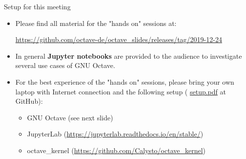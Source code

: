 \begin{frame}{Setup for this meeting}
\begin{itemize}
\itemsep1em
\item
Please find all material for the "hands on" sessions at:

{\color{DarkBlue}\small
\url{https://github.com/octave-de/octave_slides/releases/tag/2019-12-24}
}

\item
In general \textbf{Jupyter notebooks} are provided to the audience
to investigate several use cases of GNU Octave.

\item
For the best experience of the "hands on" sessions,
please bring your own laptop with Internet connection and the following setup
({\color{red}
\href{https://github.com/octave-de/octave_slides/releases/tag/2019-12-24}{setup.pdf}} at GitHub):

\begin{itemize}
\itemsep1em
\item
GNU Octave (see next slide)
\item
JupyterLab
({\color{DarkBlue}\url{https://jupyterlab.readthedocs.io/en/stable/}})
\item
octave\_kernel
({\color{DarkBlue}\url{https://github.com/Calysto/octave_kernel}})
\end{itemize}
\end{itemize}
\end{frame}


